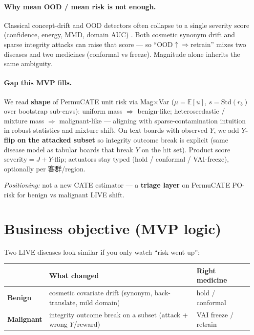 \documentclass[11pt]{article}
\begin{document}
\paragraph{Why mean OOD / mean risk is not enough.}
Classical concept-drift and OOD detectors often collapse to a single
severity score (confidence, energy, MMD, domain AUC)
\cite{hendrycks2017,liu2020}.
Both cosmetic synonym drift and sparse integrity attacks can raise that
score --- so ``OOD$\uparrow\Rightarrow$retrain'' mixes two diseases and
two medicines (conformal vs freeze).
Magnitude alone inherits the same ambiguity.

\paragraph{Gap this MVP fills.}
We read \textbf{shape} of PermuCATE unit risk via Mag$\times$Var
($\mu=\mathbb{E}[u]$, $s=\mathrm{Std}(r_b)$ over bootstrap sub-envs):
uniform mass $\Rightarrow$ benign-like; heteroscedastic / mixture mass
$\Rightarrow$ malignant-like --- aligning with sparse-contamination
intuition in robust statistics and mixture shift.
On text boards with observed $Y$, we add \textbf{$Y$-flip on the attacked
subset} so integrity outcome break is explicit (same disease model as
tabular boards that break $Y$ on the hit set).
Product score $\mathrm{severity}=J+Y$-flip; actuators stay typed
(hold / conformal / VAI-freeze), optionally per 客群/region.

\noindent\textit{Positioning:}
not a new CATE estimator --- a \textbf{triage layer} on PermuCATE PO-risk
for benign vs malignant LIVE shift.

\section{Business objective (MVP logic)}

Two LIVE diseases look similar if you only watch ``risk went up'':

\begin{center}
\small
\begin{tabular}{@{}lll@{}}
\toprule
 & What changed & Right medicine \\
\midrule
\textbf{Benign} & cosmetic covariate drift (synonym, back-translate, mild domain) &
  hold / conformal \\
\textbf{Malignant} & integrity outcome break on a subset (attack + wrong $Y$/reward) &
  VAI freeze / retrain \\
\bottomrule
\end{tabular}
\end{center}
\end{document}
